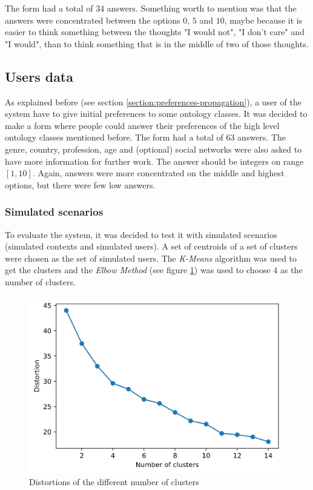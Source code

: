 The form had a total of 34 answers. Something worth to mention was that the answers were concentrated between the options $0$, $5$ and $10$, maybe because it is easier to think something between the thoughts "I would not", "I don't care" and "I would", than to think something that is in the middle of two of those thoughts.

\subsection{Users data}
As explained before (see section \ref{section:preferences-propagation}), a user of the system have to give initial preferences to some ontology classes. It was decided to make a form where people could answer their preferences of the high level ontology classes mentioned before. The form had a total of 63 answers. The genre, country, profession, age and (optional) social networks were also asked to have more information for further work. The answer should be integers on range $[1, 10]$. Again, answers were more concentrated on the middle and highest options, but there were few low answers.

\subsubsection{Simulated scenarios}
To evaluate the system, it was decided to test it with simulated scenarios (simulated contexts and simulated users). A set of centroids of a set of clusters were chosen as the set of simulated users. The \textit{K-Means} algorithm was used to get the clusters and the \textit{Elbow Method} (see figure \ref{fig:elbow}) was used to choose $4$ as the number of clusters.
\begin{figure}[h]
    \centering
    \includegraphics[scale=0.45]{elbow.png}
    \caption{Distortions of the different number of clusters}
    \label{fig:elbow}
\end{figure}

